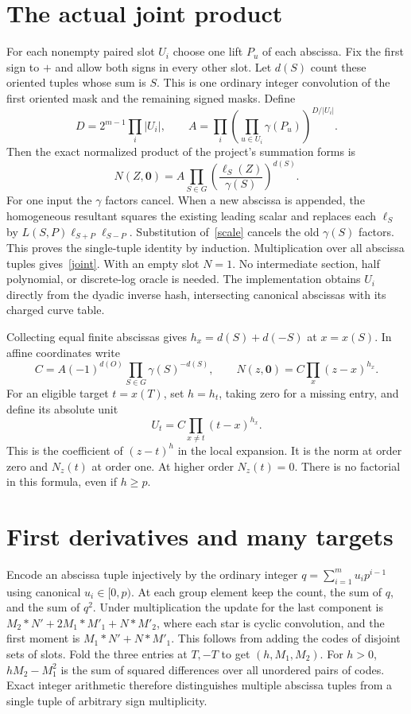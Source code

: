\documentclass[11pt]{article}
\begin{document}
\section{The actual joint product}
For each nonempty paired slot $U_i$ choose one lift $P_u$ of each
abscissa. Fix the first sign to $+$ and allow both signs in every
other slot. Let $d(S)$ count these oriented tuples whose sum is
$S$. This is one ordinary integer convolution of the first
oriented mask and the remaining signed masks. Define
\[
 D=2^{m-1}\prod_i|U_i|,\qquad
 A=\prod_i\left(\prod_{u\in U_i}\gamma(P_u)\right)^{D/|U_i|}.
\]
Then the exact normalized product of the project's summation forms is
\begin{equation}
 N(Z,\mathbf0)=A\prod_{S\in G}
   \left(\frac{\ell_S(Z)}{\gamma(S)}\right)^{d(S)}.
 \label{joint}
\end{equation}
For one input the $\gamma$ factors cancel. When a new abscissa
is appended, the homogeneous resultant squares the existing
leading scalar and replaces each $\ell_S$ by
$L(S,P)\ell_{S+P}\ell_{S-P}$. Substitution of~\eqref{scale}
cancels the old $\gamma(S)$ factors. This proves the single-tuple
identity by induction. Multiplication over all abscissa tuples
gives~\eqref{joint}. With an empty slot $N=1$. No intermediate
section, half polynomial, or discrete-log oracle is needed.
The implementation obtains $U_i$ directly from the dyadic
inverse hash, intersecting canonical abscissas with its charged
curve table.

Collecting equal finite abscissas gives $h_x=d(S)+d(-S)$ at
$x=x(S)$. In affine coordinates write
\[
 C=A(-1)^{d(O)}\prod_{S\in G}\gamma(S)^{-d(S)},\qquad
 N(z,\mathbf0)=C\prod_x(z-x)^{h_x}.
\]
For an eligible target $t=x(T)$, set $h=h_t$, taking zero for a
missing entry, and define its absolute unit
\begin{equation}
 U_t=C\prod_{x\ne t}(t-x)^{h_x}.
 \label{unit}
\end{equation}
This is the coefficient of $(z-t)^h$ in the local expansion.
It is the norm at order zero and $N_z(t)$ at order one.
At higher order $N_z(t)=0$. There is no factorial in this
formula, even if $h\ge p$.

\section{First derivatives and many targets}
Encode an abscissa tuple injectively by the ordinary integer
$q=\sum_{i=1}^m u_i p^{i-1}$ using canonical $u_i\in[0,p)$.
At each group element keep the count, the sum of $q$, and the sum
of $q^2$. Under multiplication the update for the last component is
$M_2*N'+2M_1*M'_1+N*M'_2$, where each star is cyclic convolution,
and the first moment is $M_1*N'+N*M'_1$. This follows from adding
the codes of disjoint sets of slots. Fold the three entries at
$T,-T$ to get $(h,M_1,M_2)$.
For $h>0$, $hM_2-M_1^2$ is the sum of squared differences over
all unordered pairs of codes. Exact integer arithmetic therefore
distinguishes multiple abscissa tuples from a single tuple of
arbitrary sign multiplicity.
\end{document}
